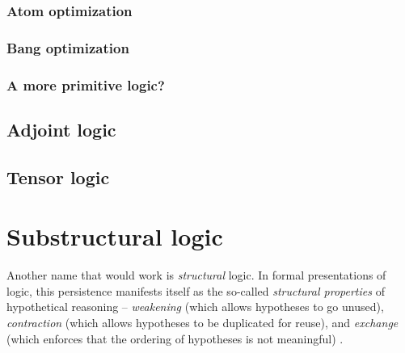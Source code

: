 \subsection{Atom optimization}

\subsection{Bang optimization}

\subsection{A more primitive logic?}

\section{Adjoint logic}

\section{Tensor logic}

\chapter{Substructural logic}

Another name that would work
is {\it structural} logic. In formal presentations of logic, this
persistence manifests itself as the so-called {\it structural
  properties} of hypothetical reasoning -- {\it weakening} (which
allows hypotheses to go unused), {\it contraction} (which allows
hypotheses to be duplicated for reuse), and {\it exchange} (which
enforces that the ordering of hypotheses is not meaningful)
\cite{gentzen35untersuchungen}.

